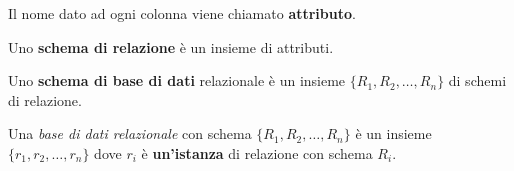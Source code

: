 Il nome dato ad ogni colonna viene chiamato \textbf{attributo}.
\begin{defn}
 Uno \textbf{schema di relazione} è un insieme di attributi. 
\end{defn}
\begin{defn}
 Uno \textbf{schema di base di dati} relazionale è un insieme $\{R_1, R_2, \ldots, R_n\}$ di 
 schemi di relazione. 
\end{defn}
\begin{defn}
 Una \emph{base di dati relazionale} con schema $\{R_1, R_2, \ldots, R_n\}$ è un insieme
 $\{r_1, r_2, \ldots, r_n\}$ dove $r_i$ è \textbf{un'istanza} di relazione con schema $R_i$.
\end{defn}

